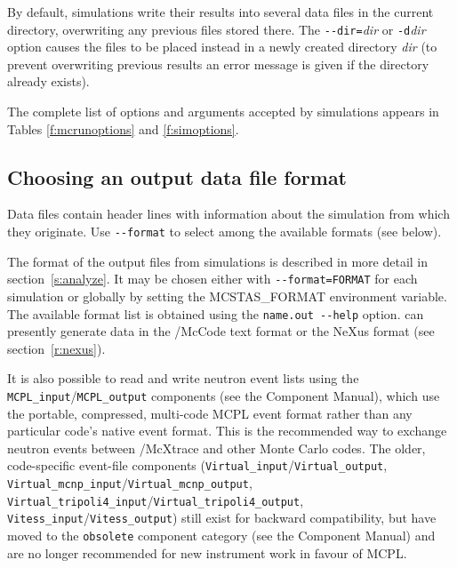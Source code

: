 By default, \MCS simulations write their results into several data files in the
current directory, overwriting any previous files stored there. The
\verb+--dir=+\textit{dir} or \verb+-d+\textit{dir} option causes the files to be
placed instead in a newly created directory \textit{dir} (to prevent overwriting
previous results an error message is given if the directory already exists).


The complete list of options
and arguments accepted by \MCS simulations appears in
Tables \ref{f:mcrunoptions} and \ref{f:simoptions}.

\subsection{Choosing an output data file format}

Data files contain header lines with information about the simulation from which
they originate. Use \verb+--format+ to select among the available formats
(see below).

The format of the output files from \MCS simulations is described in more
detail in section~\ref{s:analyze}. It may be chosen either with
\verb+--format=FORMAT+ for each simulation or globally by setting the
MCSTAS\_FORMAT environment variable.
The available format list is obtained using the \verb+name.out --help+ option.
\MCS can presently generate data in the \MCS/McCode text format or the NeXus
format (see section~\ref{r:nexus}).

It is also possible to read and write neutron event lists using the
\texttt{MCPL\_input}/\texttt{MCPL\_output} components (see the Component
Manual), which use the portable, compressed, multi-code MCPL event format
rather than any particular code's native event format. This is the
recommended way to exchange neutron events between \MCS/McXtrace and other
Monte Carlo codes. The older, code-specific event-file
components (\texttt{Virtual\_input}/\texttt{Virtual\_output},
\texttt{Virtual\_mcnp\_input}/\texttt{Virtual\_mcnp\_output},
\texttt{Virtual\_tripoli4\_input}/\texttt{Virtual\_tripoli4\_output},
\texttt{Vitess\_input}/\texttt{Vitess\_output}) still exist for backward
compatibility, but have moved to the \texttt{obsolete} component category
(see the Component Manual) and are no longer recommended for new
instrument work in favour of MCPL.  

